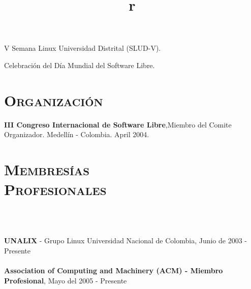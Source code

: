 \begin{resume}
\begin{position}
V Semana Linux Universidad Distrital (SLUD-V).
\end{position}


\begin{position}
Celebraci\'{o}n del D\'{i}a Mundial del Software Libre.
\end{position}
\newline
\newline
\newline



\section{\textsc{Organizaci\'{o}n}}
\employer{\textbf{}}
\dates{}
\textbf{III Congreso Internacional de Software Libre},Miembro del Comite Organizador. Medell\'{i}n - Colombia. April 2004.
\newline     


\section{\textsc{Membres\'{i}as\\ Profesionales}}

\begin{formatb}
  \\
  \body\\
\end{formatb}
\employer{}
   {\textbf{UNALIX} - Grupo Linux Universidad Nacional de Colombia,
     Junio de 2003 - Presente \\ \\
    \textbf{Association of Computing and Machinery (ACM) - Miembro Profesional}, Mayo del  2005 - Presente

     }



\begin{formatb}
  \title{r}\\
  \\
 \body\\
\end{formatb}


\end{resume}

